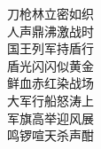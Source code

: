 \begin{translation*}{}
\begin{parcolumns}[nofirstindent=true]{3}
{      刀枪林立密如织\\
      人声鼎沸激战时\\
      国王列军持盾行\\
      盾光闪闪似黄金\\
      鲜血赤红染战场\\
      大军行船怒涛上\\
      军旗高举迎风展\\
      鸣锣喧天杀声酣\\
    }


    \colplacechunks
  \end{parcolumns}
\end{translation*}
